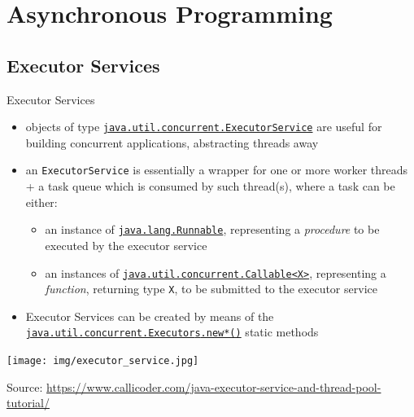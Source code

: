 \documentclass{beamer}\mode<presentation>{\usetheme{AMSBolognaFC}}
\begin{document}
\section{Asynchronous Programming}

\subsection{Executor Services}

\begin{frame}[c,allowframebreaks]{Executor Services}

	\begin{itemize}
		\item objects of type \href{https://docs.oracle.com/javase/8/docs/api/java/util/concurrent/ExecutorService.html}{\texttt{java.util.concurrent.\alert{ExecutorService}}} are useful for building \alert{concurrent} applications, abstracting threads away

		\bigskip

		\item an \alert{\texttt{ExecutorService}} is essentially a wrapper for one or more \alert{worker} threads + a \alert{task queue} which is consumed by such thread(s), where a task can be either:
		\begin{itemize}
			\item an instance of \href{https://docs.oracle.com/javase/8/docs/api/java/lang/Runnable.html}{\texttt{java.lang.\alert{Runnable}}}, representing a \emph{procedure} to be \alert{executed} by the executor service

			\item an instances of \href{https://docs.oracle.com/javase/8/docs/api/java/util/concurrent/Callable.html}{\texttt{java.util.concurrent.\alert{Callable<X>}}}, representing a \emph{function}, returning type \texttt{X}, to be \alert{submitted} to the executor service
		\end{itemize}

		\bigskip

		\item Executor Services can be created by means of the \href{https://docs.oracle.com/javase/8/docs/api/java/util/concurrent/Executors.html}{\texttt{java.util.concurrent.Executor\alert{s}.new*()}} static methods
	\end{itemize}

	\framebreak

	\begin{center}
		\texttt{[image: img/executor\_service.jpg]}

		{\tiny Source: \url{https://www.callicoder.com/java-executor-service-and-thread-pool-tutorial/}}
	\end{center}

	\framebreak

	

\end{frame}
\end{document}
